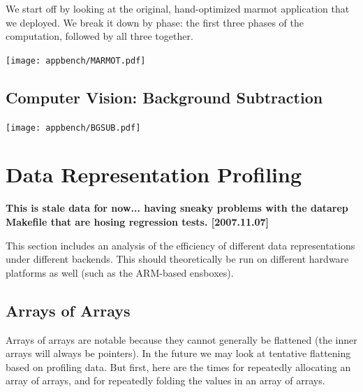 \documentclass{article}
\begin{document}
We start off by looking at the original, hand-optimized marmot
application that we deployed.  We break it down by phase: the first
three phases of the computation, followed by all three together.

\begin{center}
\texttt{[image: appbench/MARMOT.pdf]}
\end{center}

\subsection{Computer Vision: Background Subtraction}


\begin{center}
\texttt{[image: appbench/BGSUB.pdf]}
\end{center}



\section{Data Representation Profiling}

{\bf This is stale data for now... having sneaky problems with the
datarep Makefile that are hosing regression tests. [2007.11.07]}

This section includes an analysis of the efficiency of different data
representations under different backends.  This should theoretically
be run on different hardware platforms as well (such as the ARM-based ensboxes).

\subsection{Arrays of Arrays}

Arrays of arrays are notable because they cannot generally be
flattened (the inner arrays will always be pointers).  In the future
we may look at tentative flattening based on profiling data.  But
first, here are the times for repeatedly allocating an array of
arrays, and for repeatedly folding the values in an array of arrays.
\end{document}
